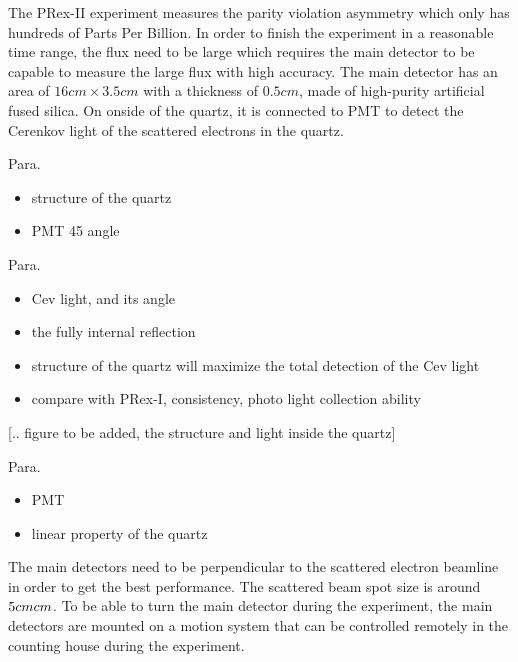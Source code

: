 The PRex-II experiment measures the parity violation asymmetry which only has hundreds of Parts Per Billion. In order to finish the experiment in a reasonable time range, the flux need to be large which requires the main detector to be capable to measure the large flux with high accuracy. The main detector has an area of $16cm \times 3.5cm$ with a thickness of $0.5cm$, made of high-purity artificial fused silica. On onside of the quartz, it is connected to PMT to detect the Cerenkov light of the scattered electrons in the quartz. 





Para. 

\begin{itemize}
    \item structure of the quartz 
    \item  PMT 45 angle
\end{itemize}


Para. 

\begin{itemize}
    \item Cev light, and its angle 
    \item the fully internal reflection 
    \item structure of the quartz will maximize the total detection of the Cev light
    \item compare with PRex-I, consistency, photo light collection ability
\end{itemize}


[.. figure to be added, the structure and light inside the quartz]


Para. 
\begin{itemize}
    \item PMT
    \item linear property of the quartz
\end{itemize}


The main detectors need to be perpendicular to the scattered electron beamline in order to get the best performance. The scattered beam spot size is around $5cm \time
 5cm $. To be able to turn the main detector during the experiment, the main detectors are mounted on a motion system that can be controlled remotely in the counting house during the experiment.  


